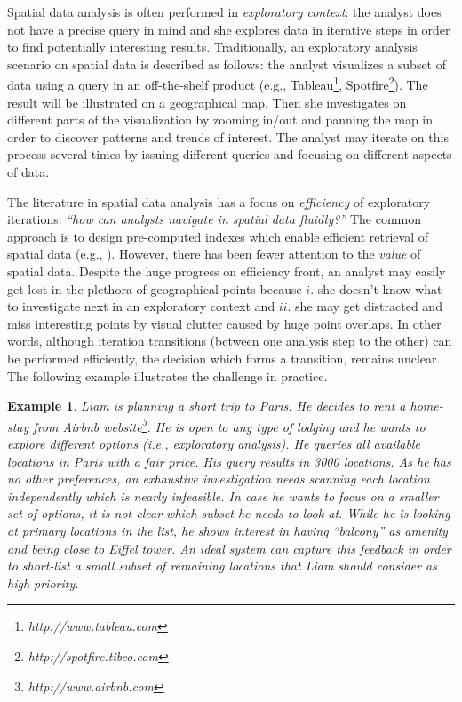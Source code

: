 \documentclass{vldb}
\newtheorem{example}{Example}
\begin{document}
Spatial data analysis is often performed in {\em exploratory context}: the analyst does not have a precise query in mind and she explores data in iterative steps in order to find potentially interesting results. Traditionally, an exploratory analysis scenario on spatial data is described as follows: the analyst visualizes a subset of data using a query in an off-the-shelf product (e.g., Tableau\footnote{\it http://www.tableau.com},
Spotfire\footnote{\it http://spotfire.tibco.com}). The result will be illustrated on a geographical map. Then she investigates on different parts of the visualization by zooming in/out and panning the map in order to discover patterns and trends of interest. The analyst may iterate on this process several times by issuing different queries and focusing on different aspects of data. 

The literature in spatial data analysis has a focus on {\em efficiency} of exploratory iterations: {\em ``how can analysts navigate in spatial data fluidly?''} The common approach is to design pre-computed indexes which enable efficient retrieval of spatial data (e.g., \cite{lins2013nanocubes}). However, there has been fewer attention to the {\em value} of spatial data. Despite the huge progress on efficiency front, an analyst may easily get lost in the plethora of geographical points because $i.$ she doesn't know what to investigate next in an exploratory context and $ii.$ she may get distracted and miss interesting points by visual clutter caused by huge point overlaps. In other words, although iteration transitions (between one analysis step to the other) can be performed efficiently, the decision which forms a transition, remains unclear. The following example illustrates the challenge in practice.

\begin{example}
\label{ex:airbnb}
Liam is planning a short trip to Paris. He decides to rent a home-stay from Airbnb website\footnote{\it http://www.airbnb.com}. He is open to any type of lodging and he wants to explore different options (i.e., exploratory analysis). He queries all available locations in Paris with a fair price. His query results in 3000 locations. As he has no other preferences, an exhaustive investigation needs scanning each location independently which is nearly infeasible. In case he wants to focus on a smaller set of options, it is not clear which subset he needs to look at. While he is looking at primary locations in the list, he shows interest in having ``balcony'' as amenity and being close to Eiffel tower. An ideal system can capture this feedback in order to short-list a small subset of remaining locations that Liam should consider as high priority.
\end{example}
\end{document}
